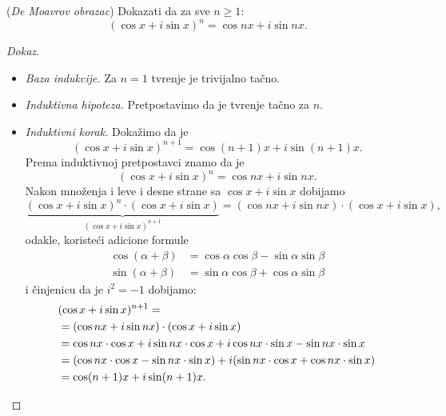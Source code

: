 \begin{EX}
  (\textit{De Moavrov obrazac})
  Dokazati da za sve $n \ge 1$:
  $$
    (\cos x + i \sin x)^n = \cos nx + i \sin nx.
  $$
\end{EX}
\begin{proof}[Dokaz]
  \begin{itemize}
  \item
    \emph{Baza indukcije.} Za $n = 1$ tvr\dj enje je trivijalno ta\v cno.
  
  \item
    \emph{Induktivna hipoteza.} Pretpostavimo da je tvr\dj enje ta\v cno za $n$.
  \item
    \emph{Induktivni korak.} Doka\v zimo da je
    $$
      (\cos x + i \sin x)^{n+1} = \cos (n + 1)x + i \sin (n + 1)x.
    $$
    Prema induktivnoj pretpostavci znamo da je
    $$
      (\cos x + i \sin x)^n = \cos nx + i \sin nx.
    $$
    Nakon mno\v zenja i leve i desne strane sa $\cos x + i \sin x$ dobijamo
    $$
      \underbrace{(\cos x + i \sin x)^n \cdot (\cos x + i \sin x)}_{(\cos x + i \sin x)^{n + 1}} = (\cos nx + i \sin nx) \cdot (\cos x + i \sin x),
    $$
    odakle, koriste\'ci adicione formule
    \begin{align*}
      \cos(\alpha + \beta) &= \cos \alpha \cos \beta - \sin \alpha \sin \beta\\
      \sin(\alpha + \beta) &= \sin \alpha \cos \beta + \cos \alpha \sin \beta
    \end{align*}
    i \v cinjenicu da je $i^2 = -1$ dobijamo:
    \begin{align*}
      &(\cos x + i \sin x)^{n + 1} = \\
      & = (\cos nx + i \sin nx) \cdot (\cos x + i \sin x)\\
      & = \cos nx \cdot \cos x + i \sin nx \cdot \cos x + i \cos nx \cdot \sin x - \sin nx \cdot \sin x\\
      & = (\cos nx \cdot \cos x  - \sin nx \cdot \sin x) + i (\sin nx \cdot \cos x + \cos nx \cdot \sin x)\\
      & = \cos (n + 1)x + i \sin (n + 1)x.\qedhere
    \end{align*}
  \end{itemize}
\end{proof}


